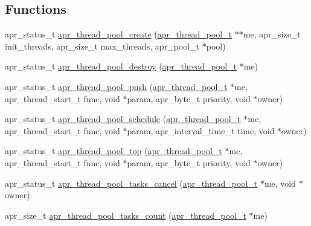 \subsection*{Functions}
\begin{DoxyCompactItemize}
\item 
apr\-\_\-status\-\_\-t \hyperlink{group___a_p_r___util___t_p_ga9c4351f2f93d223c159c1f8e5481830e}{apr\-\_\-thread\-\_\-pool\-\_\-create} (\hyperlink{group___a_p_r___util___t_p_gab31b68a03a0d5eec3e1879c253d3b620}{apr\-\_\-thread\-\_\-pool\-\_\-t} $\ast$$\ast$me, apr\-\_\-size\-\_\-t init\-\_\-threads, apr\-\_\-size\-\_\-t max\-\_\-threads, apr\-\_\-pool\-\_\-t $\ast$pool)
\item 
apr\-\_\-status\-\_\-t \hyperlink{group___a_p_r___util___t_p_gab06b4fdfc684c88781abf201d53a44eb}{apr\-\_\-thread\-\_\-pool\-\_\-destroy} (\hyperlink{group___a_p_r___util___t_p_gab31b68a03a0d5eec3e1879c253d3b620}{apr\-\_\-thread\-\_\-pool\-\_\-t} $\ast$me)
\item 
apr\-\_\-status\-\_\-t \hyperlink{group___a_p_r___util___t_p_gad66fb92679a8f456ff8e8ea1629eb041}{apr\-\_\-thread\-\_\-pool\-\_\-push} (\hyperlink{group___a_p_r___util___t_p_gab31b68a03a0d5eec3e1879c253d3b620}{apr\-\_\-thread\-\_\-pool\-\_\-t} $\ast$me, apr\-\_\-thread\-\_\-start\-\_\-t func, void $\ast$param, apr\-\_\-byte\-\_\-t priority, void $\ast$owner)
\item 
apr\-\_\-status\-\_\-t \hyperlink{group___a_p_r___util___t_p_gaa79df50c650442b8d39e169f4e422d3b}{apr\-\_\-thread\-\_\-pool\-\_\-schedule} (\hyperlink{group___a_p_r___util___t_p_gab31b68a03a0d5eec3e1879c253d3b620}{apr\-\_\-thread\-\_\-pool\-\_\-t} $\ast$me, apr\-\_\-thread\-\_\-start\-\_\-t func, void $\ast$param, apr\-\_\-interval\-\_\-time\-\_\-t time, void $\ast$owner)
\item 
apr\-\_\-status\-\_\-t \hyperlink{group___a_p_r___util___t_p_ga9acb6218820184f0617eecf56f0d3d84}{apr\-\_\-thread\-\_\-pool\-\_\-top} (\hyperlink{group___a_p_r___util___t_p_gab31b68a03a0d5eec3e1879c253d3b620}{apr\-\_\-thread\-\_\-pool\-\_\-t} $\ast$me, apr\-\_\-thread\-\_\-start\-\_\-t func, void $\ast$param, apr\-\_\-byte\-\_\-t priority, void $\ast$owner)
\item 
apr\-\_\-status\-\_\-t \hyperlink{group___a_p_r___util___t_p_gaee3d7332cf2591f42472e8be0bcbff87}{apr\-\_\-thread\-\_\-pool\-\_\-tasks\-\_\-cancel} (\hyperlink{group___a_p_r___util___t_p_gab31b68a03a0d5eec3e1879c253d3b620}{apr\-\_\-thread\-\_\-pool\-\_\-t} $\ast$me, void $\ast$owner)
\item 
apr\-\_\-size\-\_\-t \hyperlink{group___a_p_r___util___t_p_ga4f628cbec0365bb39be715a3c7ff0ec3}{apr\-\_\-thread\-\_\-pool\-\_\-tasks\-\_\-count} (\hyperlink{group___a_p_r___util___t_p_gab31b68a03a0d5eec3e1879c253d3b620}{apr\-\_\-thread\-\_\-pool\-\_\-t} $\ast$me)
$$
\end{DoxyCompactItemize}
